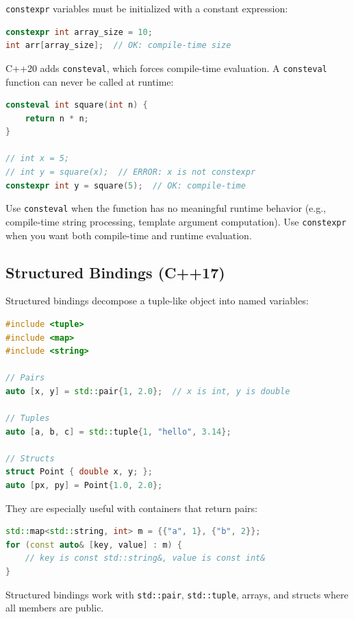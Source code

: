 \texttt{constexpr} variables must be initialized with a constant expression:

\begin{lstlisting}[language=C++]
constexpr int array_size = 10;
int arr[array_size];  // OK: compile-time size
\end{lstlisting}

C++20 adds \texttt{consteval}, which forces compile-time evaluation. A \texttt{consteval} function can never be called at runtime:

\begin{lstlisting}[language=C++]
consteval int square(int n) {
    return n * n;
}

// int x = 5;
// int y = square(x);  // ERROR: x is not constexpr
constexpr int y = square(5);  // OK: compile-time
\end{lstlisting}

Use \texttt{consteval} when the function has no meaningful runtime behavior (e.g., compile-time string processing, template argument computation). Use \texttt{constexpr} when you want both compile-time and runtime evaluation.

\subsection{Structured Bindings (C++17)}

Structured bindings decompose a tuple-like object into named variables:

\begin{lstlisting}[language=C++]
#include <tuple>
#include <map>
#include <string>

// Pairs
auto [x, y] = std::pair{1, 2.0};  // x is int, y is double

// Tuples
auto [a, b, c] = std::tuple{1, "hello", 3.14};

// Structs
struct Point { double x, y; };
auto [px, py] = Point{1.0, 2.0};
\end{lstlisting}

They are especially useful with containers that return pairs:

\begin{lstlisting}[language=C++]
std::map<std::string, int> m = {{"a", 1}, {"b", 2}};
for (const auto& [key, value] : m) {
    // key is const std::string&, value is const int&
}
\end{lstlisting}

Structured bindings work with \texttt{std::pair}, \texttt{std::tuple}, arrays, and structs where all members are public.

